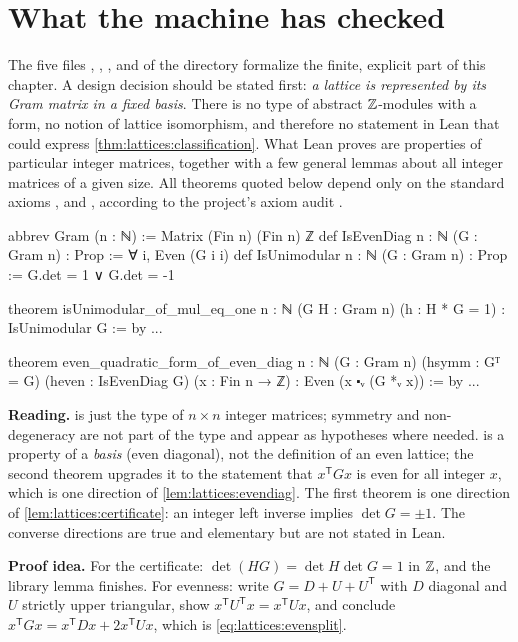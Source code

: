 \section{What the machine has checked}\label{sec:lattices:lean}

The five files , , ,
 and  of the directory
 formalize the finite, explicit part of this chapter. A
design decision should be stated first: \emph{a lattice is represented by its Gram matrix in
a fixed basis}. There is no type of abstract $\mathbb{Z}$-modules with a form, no notion of lattice
isomorphism, and therefore no statement in Lean that could express
\cref{thm:lattices:classification}. What Lean proves are properties of particular integer
matrices, together with a few general lemmas about all integer matrices of a given size. All
theorems quoted below depend only on the standard axioms ,
 and , according to the project's axiom audit
.

\begin{leanbox}
\begin{leancode}
abbrev Gram (n : ℕ) := Matrix (Fin n) (Fin n) ℤ
def IsEvenDiag {n : ℕ} (G : Gram n) : Prop := ∀ i, Even (G i i)
def IsUnimodular {n : ℕ} (G : Gram n) : Prop := G.det = 1 ∨ G.det = -1

theorem isUnimodular_of_mul_eq_one {n : ℕ} (G H : Gram n) (h : H * G = 1) :
    IsUnimodular G := by ...

theorem even_quadratic_form_of_even_diag {n : ℕ} (G : Gram n)
    (hsymm : Gᵀ = G) (heven : IsEvenDiag G) (x : Fin n → ℤ) :
    Even (x ⬝ᵥ (G *ᵥ x)) := by ...
\end{leancode}
\textbf{Reading.}  is just the type of $n\times n$ integer matrices; symmetry
and non-degeneracy are not part of the type and appear as hypotheses where needed.
 is a property of a \emph{basis} (even diagonal), not the definition of an
even lattice; the second theorem upgrades it to the statement that $x^{\mathsf T}Gx$ is even
for all integer $x$, which is one direction of \cref{lem:lattices:evendiag}. The first theorem
is one direction of \cref{lem:lattices:certificate}: an integer left inverse implies
$\det G=\pm1$. The converse directions are true and elementary but are not stated in Lean.

\textbf{Proof idea.} For the certificate: $\det(HG)=\det H\det G=1$ in $\mathbb{Z}$, and the library
lemma  finishes. For evenness: write
$G=D+U+U^{\mathsf T}$ with $D$ diagonal and $U$ strictly upper triangular, show
$x^{\mathsf T}U^{\mathsf T}x=x^{\mathsf T}Ux$, and conclude
$x^{\mathsf T}Gx=x^{\mathsf T}Dx+2x^{\mathsf T}Ux$, which is \eqref{eq:lattices:evensplit}.
\end{leanbox}


